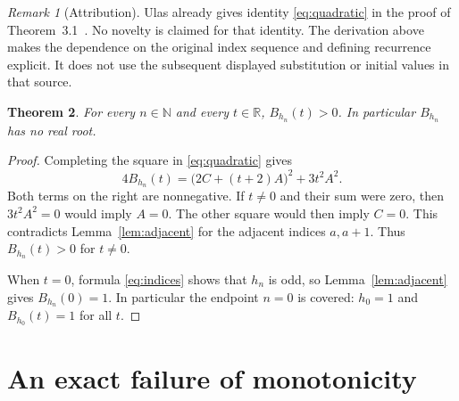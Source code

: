 \documentclass[11pt]{article}
\newtheorem{theorem}{Theorem}
\theoremstyle{remark}
\newtheorem{remark}[theorem]{Remark}
\newcommand{\N}{\mathbb{N}}
\newcommand{\R}{\mathbb{R}}
\begin{document}
\begin{remark}[Attribution]
Ulas already gives identity \eqref{eq:quadratic} in the proof of
Theorem~3.1~\cite[p.~13]{Ulas}. No novelty is claimed for that identity.
The derivation above makes the
dependence on the original index sequence and defining recurrence
explicit. It does not use the subsequent displayed substitution or
initial values in that source.
\end{remark}

\begin{theorem}\label{thm:positivity}
For every $n\in\N$ and every $t\in\R$, $B_{h_n}(t)>0$.
In particular $B_{h_n}$ has no real root.
\end{theorem}
\begin{proof}
Completing the square in \eqref{eq:quadratic} gives
\begin{equation}\label{eq:sos}
 4B_{h_n}(t)=\bigl(2C+(t+2)A\bigr)^2+3t^2A^2.
\end{equation}
Both terms on the right are nonnegative. If $t\neq0$ and their
sum were zero, then $3t^2A^2=0$ would imply $A=0$. The other
square would then imply $C=0$. This contradicts
Lemma~\ref{lem:adjacent} for the adjacent indices $a,a+1$.
Thus $B_{h_n}(t)>0$ for $t\neq0$.

When $t=0$, formula \eqref{eq:indices} shows that $h_n$ is odd,
so Lemma~\ref{lem:adjacent} gives $B_{h_n}(0)=1$.
In particular the endpoint $n=0$ is covered: $h_0=1$ and
$B_{h_0}(t)=1$ for all $t$.
\end{proof}

\section{An exact failure of monotonicity}
\end{document}

